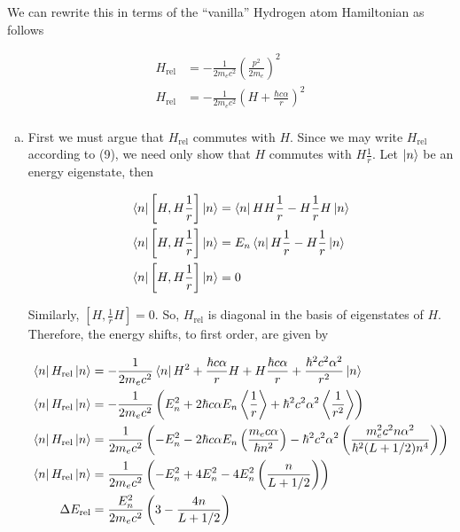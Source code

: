 \documentclass[]{article}
\begin{document}
\begin{enumerate}[1)]
We can rewrite this in terms of the ``vanilla'' Hydrogen atom Hamiltonian as follows

\begin{equation}
\begin{split}
H_\text{rel}  & = - \frac{1}{2m_ec^2} \left( \frac{p^2}{2m_e} \right)^2 \\
H_\text{rel}  & = - \frac{1}{2m_ec^2} \left( H + \frac{\hbar c \alpha}{r} \right)^2 \\
\end{split}
\end{equation}

\begin{enumerate}[a)]


\item First we must argue that $H_\text{rel}$ commutes with $H$. Since we may write $H_\text{rel}$ according to (9), we need only show that $H$ commutes with $H \frac{1}{r}$. Let $\ket{n}$ be an energy eigenstate, then 

\begin{equation}
\begin{split}
\bra{n} \left[ H,H \frac{1}{r} \right] \ket{n} & = \bra{n} H H \frac{1}{r} - H \frac{1}{r} H \ket{n}  \\
\bra{n} \left[ H,H \frac{1}{r} \right] \ket{n}  & = E_n \bra{n}  H \frac{1}{r} - H \frac{1}{r}  \ket{n}  \\
\bra{n} \left[ H,H \frac{1}{r} \right] \ket{n}  & = 0  \\
\end{split}
\end{equation}

Similarly, $\left[ H, \frac{1}{r}H\right] = 0 $. So, $H_\text{rel}$ is diagonal in the basis of eigenstates of $H$. Therefore, the energy shifts, to first order, are given by 


\begin{equation}
\begin{split}
\bra{n} H_\text{rel} \ket{n} & = - \frac{1}{2m_ec^2}  \bra{n} H^2 +  \frac{\hbar c \alpha}{r}H + H \frac{\hbar c \alpha}{r}  + \frac{\hbar^2 c^2 \alpha^2}{r^2}   \ket{n}  \\
\bra{n} H_\text{rel} \ket{n} & = - \frac{1}{2m_ec^2} \left( E_n^2 + 2  \hbar c \alpha E_n  \expval{ \frac{1}{r}}   + \hbar^2 c^2 \alpha^2  \expval{ \frac{1}{r^2}}  \right) \\ 
\bra{n} H_\text{rel} \ket{n} & = \frac{1}{2m_ec^2} \left( - E_n^2 -  2  \hbar c \alpha E_n  \left(  \frac{ m_e c\alpha }{\hbar n^2}   \right)  - \hbar^2 c^2 \alpha^2  \left(   \frac{m_e^2c^2n\alpha^2}{\hbar^2(L+1/2)n^4}  \right) \right) \\
\bra{n} H_\text{rel} \ket{n} & = \frac{1}{2m_ec^2} \left( - E_n^2 +  4  E_n^2  - 4 E_n^2 \left(   \frac{n}{L+1/2}  \right) \right) \\
\Delta E_\text{rel}  & = \frac{E_n^2}{2m_ec^2} \left( 3 -    \frac{4n}{L+1/2} \right) \\
\end{split}
\end{equation}



\end{enumerate}
\end{enumerate}
\end{document}
